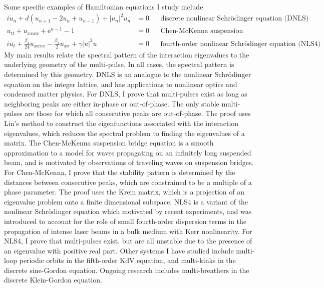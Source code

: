 \documentclass[11pt,reqno,oneside]{article}
\theoremstyle{definition}
\theoremstyle{remark}
\begin{document}
Some specific examples of Hamiltonian equations I study include
\begin{align*}
i \dot{u}_n + d(u_{n+1} - 2 u_n + u_{n-1}) + |u_n|^2 u_n &= 0 &&\text{discrete nonlinear Schr{\"o}dinger equation (DNLS)} \\
u_{tt} + u_{xxxx} + \mathrm{e}^{u-1} - 1 &= 0 &&\text{Chen-McKenna suspension bridge equation} \\
i u_t + \frac{\beta_4}{24}u_{xxxx} - \frac{\beta_2}{2}u_{xx} + \gamma |u|^2 u &= 0 && \text{fourth-order nonlinear Schr{\"o}dinger equation (NLS4)}
\end{align*}
My main results relate the spectral pattern of the interaction eigenvalues to the underlying geometry of the multi-pulse. In all cases, the spectral pattern is determined by this geometry. 
DNLS is an analogue to the nonlinear Schr{\"o}dinger equation on the integer lattice, and has applications to nonlinear optics and condensed matter physics. 
For DNLS, I prove that multi-pulses exist as long as neighboring peaks are either in-phase or out-of-phase. The only stable multi-pulses are those for which all consecutive peaks are out-of-phase. The proof uses Lin's method to construct the eigenfunctions associated with the interaction eigenvalues, which reduces the spectral problem to finding the eigenvalues of a matrix. 
The Chen-McKenna suspension bridge equation is a smooth approximation to a model for waves propagating on an infinitely long suspended beam, and is motivated by observations of traveling waves on suspension bridges. For Chen-McKenna, I prove that the stability pattern is determined by the distances between consecutive peaks, which are constrained to be a multiple of a phase parameter. The proof uses the Krein matrix, which is a projection of an eigenvalue problem onto a finite dimensional subspace. NLS4 is a variant of the nonlinear Schr{\"o}dinger equation which motivated by recent experiments, and was introduced to account for the role of small fourth-order dispersion terms in the propagation of intense laser beams in a bulk medium with Kerr nonlinearity. For NLS4, I prove that multi-pulses exist, but are all unstable due to the presence of an eigenvalue with positive real part. Other systems I have studied include multi-loop periodic orbits in the fifth-order KdV equation, and multi-kinks in the discrete sine-Gordon equation. Ongoing research includes multi-breathers in the discrete Klein-Gordon equation.
\end{document}
